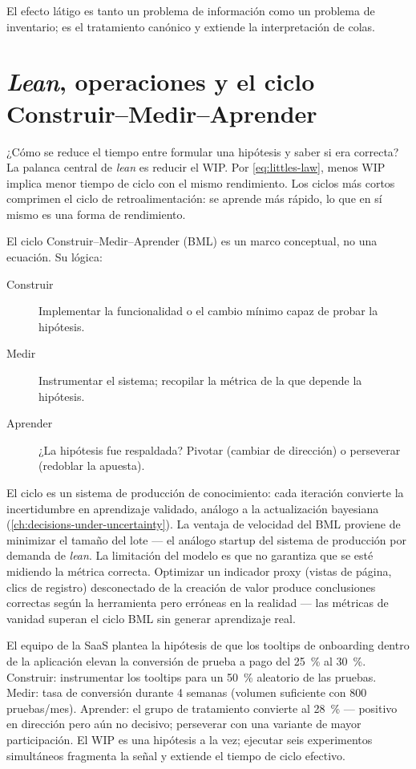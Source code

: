 El efecto látigo es tanto un problema de información como un problema de inventario; \textcite{lee1997bullwhip} es el tratamiento canónico y \textcite{cachon2024matching} extiende la interpretación de colas.

\section{\emph{Lean}, operaciones y el ciclo Construir--Medir--Aprender}\label{sec:lean-bml}

¿Cómo se reduce el tiempo entre formular una hipótesis y saber si era correcta? La palanca central de \emph{lean} es reducir el WIP. Por \cref{eq:littles-law}, menos WIP implica menor tiempo de ciclo con el mismo rendimiento. Los ciclos más cortos comprimen el ciclo de retroalimentación: se aprende más rápido, lo que en sí mismo es una forma de rendimiento.

El ciclo Construir--Medir--Aprender (BML) es un marco conceptual, no una ecuación. Su lógica:
\begin{description}
  \item[Construir] Implementar la funcionalidad o el cambio mínimo capaz de probar la hipótesis.
  \item[Medir] Instrumentar el sistema; recopilar la métrica de la que depende la hipótesis.
  \item[Aprender] ¿La hipótesis fue respaldada? Pivotar (cambiar de dirección) o perseverar (redoblar la apuesta).
\end{description}
El ciclo es un sistema de producción de conocimiento: cada iteración convierte la incertidumbre en aprendizaje validado, análogo a la actualización bayesiana (\cref{ch:decisions-under-uncertainty}). La ventaja de velocidad del BML proviene de minimizar el tamaño del lote --- el análogo startup del sistema de producción por demanda de \emph{lean}. La limitación del modelo es que no garantiza que se esté midiendo la métrica correcta. Optimizar un indicador proxy (vistas de página, clics de registro) desconectado de la creación de valor produce conclusiones correctas según la herramienta pero erróneas en la realidad --- las métricas de vanidad superan el ciclo BML sin generar aprendizaje real.

\begin{example}
El equipo de la SaaS plantea la hipótesis de que los tooltips de onboarding dentro de la aplicación elevan la conversión de prueba a pago del \qty{25}{\percent} al \qty{30}{\percent}. Construir: instrumentar los tooltips para un \qty{50}{\percent} aleatorio de las pruebas. Medir: tasa de conversión durante 4 semanas (volumen suficiente con \num{800} pruebas/mes). Aprender: el grupo de tratamiento convierte al \qty{28}{\percent} --- positivo en dirección pero aún no decisivo; perseverar con una variante de mayor participación. El WIP es una hipótesis a la vez; ejecutar seis experimentos simultáneos fragmenta la señal y extiende el tiempo de ciclo efectivo.
\end{example}

